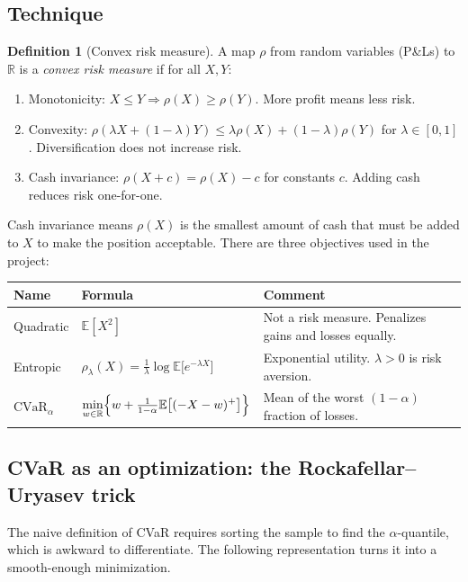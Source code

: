 \documentclass[11pt]{article}
\theoremstyle{definition}
\newtheorem{definition}[theorem]{Definition}
\theoremstyle{remark}
\newcommand{\E}{\mathbb{E}}
\newcommand{\R}{\mathbb{R}}
\newcommand{\CVaR}{\mathrm{CVaR}}
\begin{document}
\subsection{Technique}

\begin{definition}[Convex risk measure]
A map $\rho$ from random variables (P\&Ls) to $\R$ is a \emph{convex risk measure} if for all $X,Y$:
\begin{enumerate}[label=(\roman*)]
  \item Monotonicity: $X\le Y \Rightarrow \rho(X)\ge\rho(Y)$. More profit means less risk.
  \item Convexity: $\rho(\lambda X+(1-\lambda)Y)\le\lambda\rho(X)+(1-\lambda)\rho(Y)$ for $\lambda\in[0,1]$. Diversification does not increase risk.
  \item Cash invariance: $\rho(X+c)=\rho(X)-c$ for constants $c$. Adding cash reduces risk one-for-one.
\end{enumerate}
\end{definition}

Cash invariance means $\rho(X)$ is the smallest amount of cash that must be added to $X$ to make the position acceptable. There are three objectives used in the project:

\begin{center}\small
\renewcommand{\arraystretch}{1.6}
\begin{tabular}{@{}lll@{}}
\toprule
Name & Formula & Comment\\
\midrule
Quadratic & $\E[X^2]$ & Not a risk measure. Penalizes gains and losses equally.\\
Entropic & $\rho_\lambda(X)=\tfrac1\lambda\log\E\bigl[e^{-\lambda X}\bigr]$ & Exponential utility. $\lambda>0$ is risk aversion.\\
$\CVaR_\alpha$ & $\displaystyle \min_{w\in\R}\Bigl\{w+\tfrac{1}{1-\alpha}\E\bigl[(-X-w)^+\bigr]\Bigr\}$ & Mean of the worst $(1-\alpha)$ fraction of losses.\\
\bottomrule
\end{tabular}
\end{center}

\subsection{CVaR as an optimization: the Rockafellar--Uryasev trick}

The naive definition of CVaR requires sorting the sample to find the $\alpha$-quantile, which is
awkward to differentiate. The following representation turns it into a smooth-enough minimization.
\end{document}
